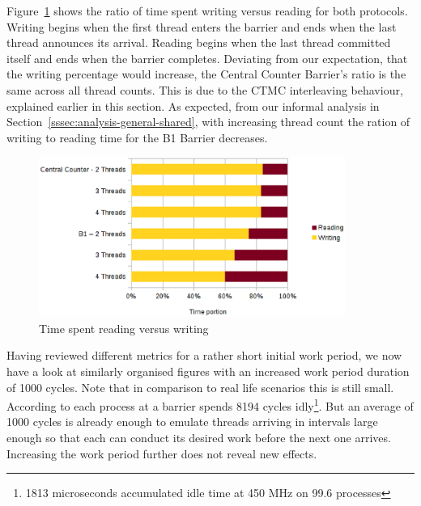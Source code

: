 \documentclass[a4paper, 10pt]{article}
\begin{document}
Figure~\ref{fig:c1-time-work-100-percent} shows the ratio of time spent writing versus reading for both protocols.
Writing begins when the first thread enters the barrier and ends when the last thread announces its arrival.
Reading begins when the last thread committed itself and ends when the barrier completes.
Deviating from our expectation, that the writing percentage would increase, the Central Counter Barrier's ratio is the same across all thread counts. This is due to the CTMC interleaving behaviour, explained earlier in this section.
As expected, from our informal analysis in Section~\ref{sssec:analysis-general-shared}, with increasing thread count the ration of writing to reading time for the B1 Barrier decreases.
\begin{figure}[htbp]
	\centering
	\includegraphics[width=10cm]{charts/c1-time-work-100-percent}
	\caption{Time spent reading versus writing}
	\label{fig:c1-time-work-100-percent}
\end{figure}

Having reviewed different metrics for a rather short initial work period, we now have a look at similarly organised figures with an increased work period duration of 1000 cycles. Note that in comparison to real life scenarios this is still small. According to \cite{rab00} each process at a barrier spends 8194 cycles idly\footnote{1813 microseconds accumulated idle time at 450 MHz on 99.6 processes}. But an average of 1000 cycles is already enough to emulate threads arriving in intervals large enough so that each can conduct its desired work before the next one arrives. Increasing the work period further does not reveal new effects.
\end{document}
